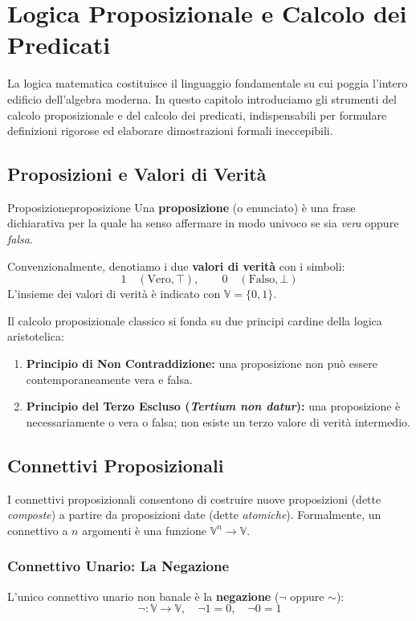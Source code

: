 \chapter{Logica Proposizionale e Calcolo dei Predicati}
\label{chap:logica}

La logica matematica costituisce il linguaggio fondamentale su cui poggia l'intero edificio dell'algebra moderna. In questo capitolo introduciamo gli strumenti del calcolo proposizionale e del calcolo dei predicati, indispensabili per formulare definizioni rigorose ed elaborare dimostrazioni formali ineccepibili.

\section{Proposizioni e Valori di Verità}

\begin{definizione}{Proposizione}{proposizione}
Una \textbf{proposizione} (o enunciato) è una frase dichiarativa per la quale ha senso affermare in modo univoco se sia \emph{vera} oppure \emph{falsa}.

Convenzionalmente, denotiamo i due \textbf{valori di verità} con i simboli:
\[
    1 \quad (\text{Vero}, \top), \qquad 0 \quad (\text{Falso}, \bot)
\]
L'insieme dei valori di verità è indicato con $\mathbb{V} = \{0, 1\}$.
\end{definizione}

Il calcolo proposizionale classico si fonda su due principi cardine della logica aristotelica:
\begin{enumerate}
    \item \textbf{Principio di Non Contraddizione:} una proposizione non può essere contemporaneamente vera e falsa.
    \item \textbf{Principio del Terzo Escluso (\emph{Tertium non datur}):} una proposizione è necessariamente o vera o falsa; non esiste un terzo valore di verità intermedio.
\end{enumerate}

\section{Connettivi Proposizionali}
I connettivi proposizionali consentono di costruire nuove proposizioni (dette \emph{composte}) a partire da proposizioni date (dette \emph{atomiche}). Formalmente, un connettivo a $n$ argomenti è una funzione $\mathbb{V}^n \to \mathbb{V}$.

\subsection{Connettivo Unario: La Negazione}
L'unico connettivo unario non banale è la \textbf{negazione} ($\neg$ oppure $\sim$):
\[
    \neg: \mathbb{V} \to \mathbb{V}, \quad \neg 1 = 0, \quad \neg 0 = 1
\]

